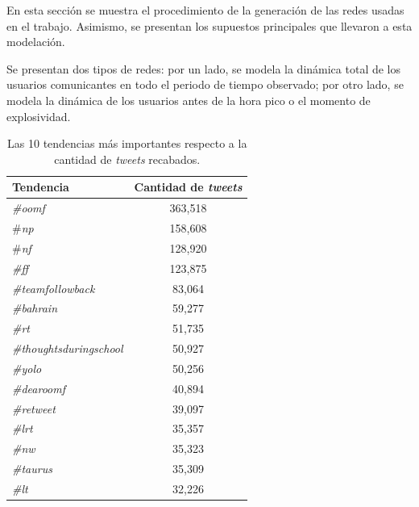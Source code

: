\documentclass[../main.tex]{subfiles}
\begin{document}
\onehalfspacing

En esta sección se muestra el procedimiento de la generación de  las redes usadas en el trabajo. Asimismo, se presentan los supuestos principales que llevaron a esta modelación.

Se presentan dos tipos de redes: por un lado, se modela la dinámica total de los usuarios comunicantes en todo el periodo de tiempo  observado; por otro lado, se modela  la dinámica de los usuarios antes de la hora pico o el momento de explosividad.


\begin{table}[h!]
    \centering
    \begin{tabular}{lc}
\toprule
             Tendencia &  Cantidad de \textit{tweets} \\
\midrule
                 \textit{\#oomf} &              363,518 \\
                   \#\textit{np} &              158,608 \\
                   \#\textit{nf} &              128,920 \\
                   \textit{\#ff} &              123,875 \\
       \textit{\#teamfollowback} &               83,064 \\
              \textit{\#bahrain} &               59,277 \\
                   \textit{\#rt} &               51,735 \\
 \textit{\#thoughtsduringschool} &               50,927 \\
                 \textit{\#yolo} &               50,256 \\
             \textit{\#dearoomf} &               40,894 \\
              \textit{\#retweet} &               39,097 \\
                  \textit{\#lrt} &               35,357 \\
                   \textit{\#nw} &               35,323 \\
               \textit{\#taurus} &               35,309 \\
                   \textit{\#lt} &               32,226 \\
\bottomrule
\end{tabular}
    \caption{Las 10 tendencias más importantes respecto a la cantidad de \textit{tweets} recabados. }
    \label{tab:metodologia_10tendenciasmasimportantes}
\end{table}
\end{document}
